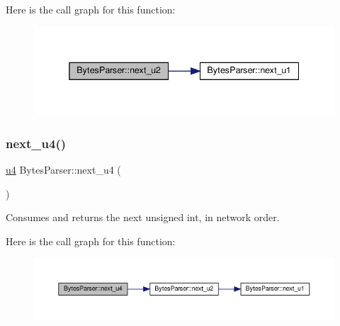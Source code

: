 Here is the call graph for this function\+:
\nopagebreak
\begin{figure}[H]
\begin{center}
\leavevmode
\includegraphics[width=338pt]{classBytesParser_a8c1d8a37eabff268351e38706a78ce2a_cgraph}
\end{center}
\end{figure}
\mbox{\label{classBytesParser_a1023beb9a406a24c4080c95fbe8fd884}} 
\subsubsection{\texorpdfstring{next\+\_\+u4()}{next\_u4()}}
{\footnotesize\ttfamily \hyperlink{types_8h_af3b2d4b29fd9faedc984db3e062b3d5d}{u4} Bytes\+Parser\+::next\+\_\+u4 (\begin{DoxyParamCaption}{ }\end{DoxyParamCaption})}



Consumes and returns the next unsigned int, in network order. 

Here is the call graph for this function\+:
\nopagebreak
\begin{figure}[H]
\begin{center}
\leavevmode
\includegraphics[width=350pt]{classBytesParser_a1023beb9a406a24c4080c95fbe8fd884_cgraph}
\end{center}
\end{figure}
\mbox{\label{classBytesParser_ab7c84f75bd3dc2bcac74fd3ff4c6510a}} 
